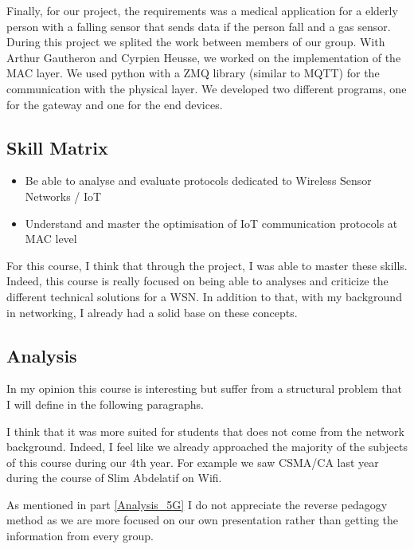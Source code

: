 Finally, for our project, the requirements was a medical application for a elderly person with a falling sensor that sends data if the person fall and a gas sensor. During this project we splited the work between members of our group. With Arthur Gautheron and Cyrpien Heusse, we worked on the implementation of the MAC layer. We used python with a ZMQ library (similar to MQTT) for the communication with the physical layer. We developed two different programs, one for the gateway and one for the end devices.

\subsection{Skill Matrix}

\begin{itemize}
    \item Be able to analyse and evaluate protocols dedicated to Wireless Sensor Networks / IoT
    \item Understand and master the optimisation of IoT communication protocols at MAC level 
\end{itemize}

For this course, I think that through the project, I was able to master these skills. Indeed, this course is really focused on being able to analyses and criticize the different technical solutions for a WSN. In addition to that, with my background in  networking, I already had a solid base on these concepts.

\subsection{Analysis}

In my opinion this course is interesting but suffer from a structural problem that I will define in the following paragraphs.
\\\par 

I think that it was more suited for students that does not come from the network background. Indeed, I feel like we already approached the majority of the subjects of this course during our 4th year. For example we saw CSMA/CA last year during the course of Slim Abdelatif on Wifi.
\\\par

As mentioned in part \ref{Analysis_5G} I do not appreciate the reverse pedagogy method as we are more focused on our own presentation rather than getting the information from every group.
\\\par

